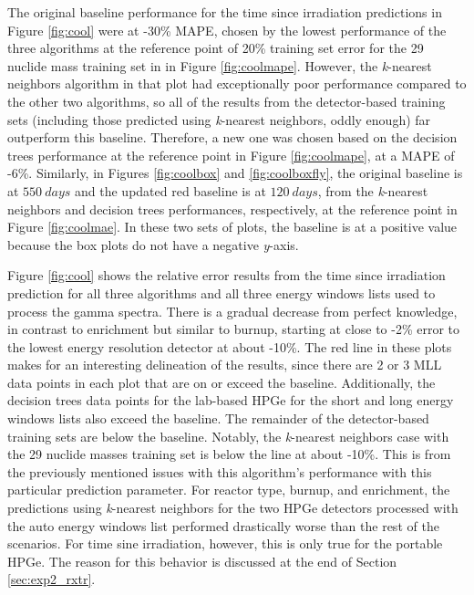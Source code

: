 The original baseline performance for the time since irradiation predictions in
Figure \ref{fig:cool} were at -30\% \gls{MAPE}, chosen by the lowest
performance of the three algorithms at the reference point of 20\% training set
error for the 29 nuclide mass training set in in Figure \ref{fig:coolmape}.
However, the \textit{k}-nearest neighbors algorithm in that plot had
exceptionally poor performance compared to the other two algorithms, so all of
the results from the detector-based training sets (including those predicted
using \textit{k}-nearest neighbors, oddly enough) far outperform this baseline.
Therefore, a new one was chosen based on the decision trees performance at the
reference point in Figure \ref{fig:coolmape}, at a \gls{MAPE} of -6\%.
Similarly, in Figures \ref{fig:coolbox} and \ref{fig:coolboxfly}, the original
baseline is at $550\:days$ and the updated red baseline is at $120\:days$, from
the \textit{k}-nearest neighbors and decision trees performances, respectively,
at the reference point in Figure \ref{fig:coolmae}.  In these two sets of
plots, the baseline is at a positive value because the box plots do not have a
negative \textit{y}-axis. 

Figure \ref{fig:cool} shows the relative error results from the time since
irradiation prediction for all three algorithms and all three energy windows
lists used to process the gamma spectra. There is a gradual decrease from
perfect knowledge, in contrast to enrichment but similar to burnup, starting at
close to -2\% error to the lowest energy resolution detector at about -10\%.
The red line in these plots makes for an interesting delineation of the
results, since there are 2 or 3 \gls{MLL} data points in each plot that are on
or exceed the baseline.  Additionally, the decision trees data points for the
lab-based \gls{HPGe} for the short and long energy windows lists also exceed
the baseline. The remainder of the detector-based training sets are below the
baseline.  Notably, the \textit{k}-nearest neighbors case with the 29 nuclide
masses training set is below the line at about -10\%.  This is from the
previously mentioned issues with this algorithm's performance with this
particular prediction parameter.  For reactor type, burnup, and enrichment, the
predictions using \textit{k}-nearest neighbors for the two \gls{HPGe} detectors
processed with the auto energy windows list performed drastically worse than
the rest of the scenarios. For time sine irradiation, however, this is only
true for the portable \gls{HPGe}.  The reason for this behavior is discussed at
the end of Section \ref{sec:exp2_rxtr}. 


